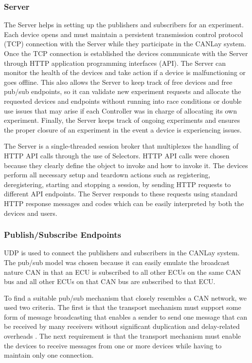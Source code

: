 \documentclass[letterpaper,twocolumn,12pt]{article}
\begin{document}
\subsubsection{Server}
The Server helps in setting up the publishers and subscribers for an experiment. Each device opens and must maintain a persistent transmission control protocol (TCP) connection with the Server while they participate in the CANLay system. Once the TCP connection is established the devices communicate with the Server through HTTP application programming interfaces (API). The Server can monitor the health of the devices and take action if a device is malfunctioning or goes offline. This also allows the Server to keep track of free devices and free pub/sub endpoints, so it can validate new experiment requests and allocate the requested devices and endpoints without running into race conditions or double use issues that may arise if each Controller was in charge of allocating its own experiment. Finally, the Server keeps track of ongoing experiments and ensures the proper closure of an experiment in the event a device is experiencing issues.

The Server is a single-threaded session broker that multiplexes the handling of HTTP API calls through the use of Selectors. HTTP API calls were chosen because they clearly define the object to invoke and how to invoke it. The devices perform all necessary setup and teardown actions such as registering, deregistering, starting and stopping a session, by sending HTTP requests to different API endpoints. The Server responds to these requests using standard HTTP response messages and codes which can be easily interpreted by both the devices and users.

\subsubsection{Publish/Subscribe Endpoints}
UDP is used to connect the publishers and subscribers in the CANLay system. 
The pub/sub model was chosen because it can easily emulate the broadcast nature CAN \cite{kaiser_implementing_1999} in that an ECU is subscribed to all other ECUs on the same CAN bus and all other ECUs on that CAN bus are subscribed to that ECU. 

To find a suitable pub/sub mechanism that closely resembles a CAN network, we used two criteria. The first is that the transport mechanism must support some form of message broadcasting that enables a sender to send one message that can be received by many receivers without significant duplication and delay-related overheads \cite{kaiser_implementing_1999}. The next requirement is that the transport mechanism must enable the devices to receive messages from one or more devices while having to maintain only one connection.
\end{document}
